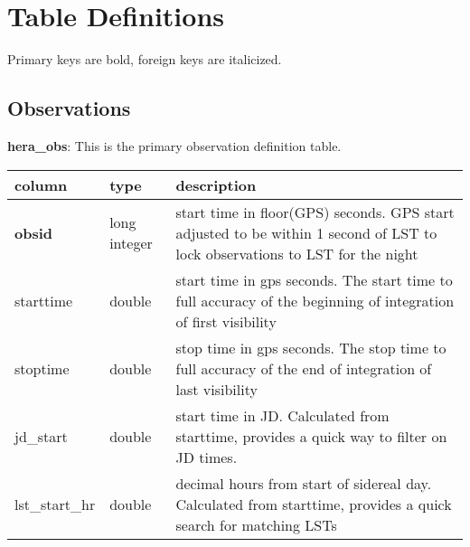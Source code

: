 \documentclass{article}
\begin{document}
\section{Table Definitions}
Primary keys are bold, foreign keys are italicized.

\subsection{Observations}
\textbf{\large{hera\_obs}}: This is the primary observation definition table.
\begin{center}
 \begin{tabular}{| p{4cm} | p{2cm} | p{10cm} |} 
 \hline
 column & type & description \\ [0.5ex]  \hline\hline
 \textbf{obsid} & long integer & start time in floor(GPS) seconds. GPS start adjusted to be within 1 second of LST to lock observations to LST for the night \\ \hline
 starttime & double & start time in gps seconds. The start time to full accuracy of the beginning of integration of first visibility \\\hline
 stoptime & double & stop time in gps seconds. The stop time to full accuracy of the end of integration of last visibility \\\hline
 jd\_start & double & start time in JD. Calculated from starttime, provides a quick way to filter on JD times. \\\hline
 lst\_start\_hr & double & decimal hours from start of sidereal day. Calculated from starttime, provides a quick search for matching LSTs \\\hline
 \end{tabular}
\end{center}
\end{document}
